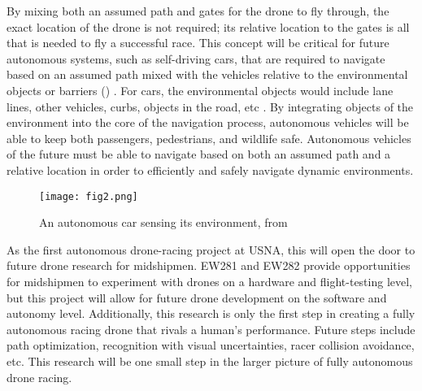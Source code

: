 \documentclass[onecolumn,10pt]{IEEEtran}
\begin{document}
By mixing both an assumed path and gates for the drone to fly through, the exact location of the drone is not required; its relative location to the gates is all that is needed to fly a successful race. This concept will be critical for future autonomous systems, such as self-driving cars, that are required to navigate based on an assumed path mixed with the vehicles relative to the environmental objects or barriers () \cite{iot2018how}. For cars, the environmental objects would include lane lines, other vehicles, curbs, objects in the road, etc \cite{rayej2014how}. By integrating objects of the environment into the core of the navigation process, autonomous vehicles will be able to keep both passengers, pedestrians, and wildlife safe. Autonomous vehicles of the future must be able to navigate based on both an assumed path and a relative location in order to efficiently and safely navigate dynamic environments.  
\begin{figure}[hb]
\begin{center}
\texttt{[image: fig2.png]}
\end{center}
\caption{An autonomous car sensing its environment, from \cite{someone}}
\label{fig:2}
\end{figure}

As the first autonomous drone-racing project at USNA, this will open the door to future drone research for midshipmen. EW281 and EW282 provide opportunities for midshipmen to experiment with drones on a hardware and flight-testing level, but this project will allow for future drone development on the software and autonomy level. Additionally, this research is only the first step in creating a fully autonomous racing drone that rivals a human’s performance. Future steps include path optimization, recognition with visual uncertainties, racer collision avoidance, etc. This research will be one small step in the larger picture of fully autonomous drone racing.
\end{document}
